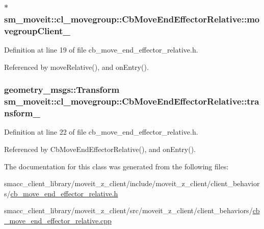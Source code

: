 \subsubsection[{\texorpdfstring{movegroup\+Client\+\_\+}{movegroupClient_}}]{$\ast$ sm\+\_\+moveit\+::cl\+\_\+movegroup\+::\+Cb\+Move\+End\+Effector\+Relative\+::movegroup\+Client\+\_\+\hspace{0.3cm}{\ttfamily [private]}}\hypertarget{classsm__moveit_1_1cl__movegroup_1_1CbMoveEndEffectorRelative_ac0592d5931ff7d0bb22446b651bbf615}{}\label{classsm__moveit_1_1cl__movegroup_1_1CbMoveEndEffectorRelative_ac0592d5931ff7d0bb22446b651bbf615}


Definition at line 19 of file cb\+\_\+move\+\_\+end\+\_\+effector\+\_\+relative.\+h.



Referenced by move\+Relative(), and on\+Entry().

\subsubsection[{\texorpdfstring{transform\+\_\+}{transform_}}]{\setlength{\rightskip}{0pt plus 5cm}geometry\+\_\+msgs\+::\+Transform sm\+\_\+moveit\+::cl\+\_\+movegroup\+::\+Cb\+Move\+End\+Effector\+Relative\+::transform\+\_\+}\hypertarget{classsm__moveit_1_1cl__movegroup_1_1CbMoveEndEffectorRelative_ab9aef693e45a8026a5e173ab55a5bce2}{}\label{classsm__moveit_1_1cl__movegroup_1_1CbMoveEndEffectorRelative_ab9aef693e45a8026a5e173ab55a5bce2}


Definition at line 22 of file cb\+\_\+move\+\_\+end\+\_\+effector\+\_\+relative.\+h.



Referenced by Cb\+Move\+End\+Effector\+Relative(), and on\+Entry().



The documentation for this class was generated from the following files\+:\begin{DoxyCompactItemize}
\item 
smacc\+\_\+client\+\_\+library/moveit\+\_\+z\+\_\+client/include/moveit\+\_\+z\+\_\+client/client\+\_\+behaviors/\hyperlink{cb__move__end__effector__relative_8h}{cb\+\_\+move\+\_\+end\+\_\+effector\+\_\+relative.\+h}\item 
smacc\+\_\+client\+\_\+library/moveit\+\_\+z\+\_\+client/src/moveit\+\_\+z\+\_\+client/client\+\_\+behaviors/\hyperlink{cb__move__end__effector__relative_8cpp}{cb\+\_\+move\+\_\+end\+\_\+effector\+\_\+relative.\+cpp}\end{DoxyCompactItemize}
